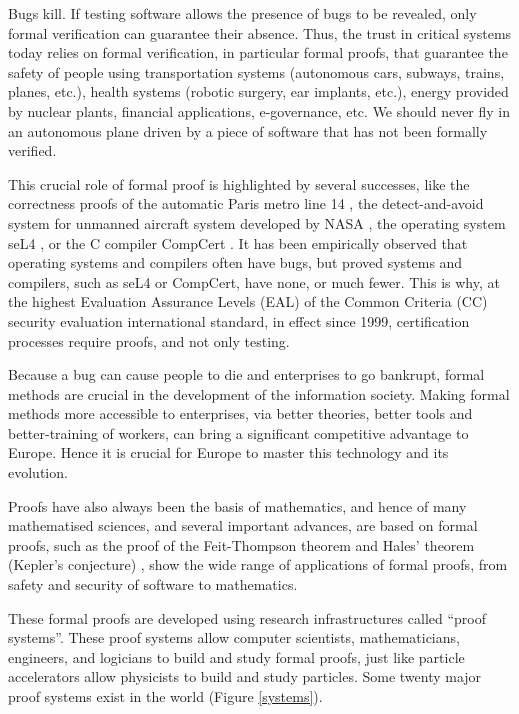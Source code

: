 \thispagestyle{empty}

Bugs kill.  If testing software allows the presence of bugs to be
revealed, only formal verification can guarantee their absence.
Thus, the
trust in critical systems today relies on formal verification, in
particular formal proofs, that guarantee the safety of people
using transportation systems (autonomous cars, subways, trains,
planes, etc.), health systems (robotic surgery, ear implants, etc.), energy provided
by nuclear plants, financial applications, e-governance, etc.  We
should never fly in an autonomous plane driven by a piece of software
that has not been formally verified.

This crucial role of formal proof is highlighted by several successes,
like the correctness proofs of the automatic Paris metro line 14
\cite{Behm98,Lecomte17}, the detect-and-avoid system for unmanned aircraft
system developed by NASA \cite{Munoz16}, the operating system seL4
\cite{Klein09}, or the C compiler CompCert \cite{Leroy06}.  It has
been empirically observed that operating systems and compilers
often
have bugs, but proved systems and compilers, such as seL4 or CompCert, have
none, or
much fewer.  This is why, at the highest Evaluation Assurance Levels (EAL)
of the Common Criteria (CC) security evaluation international standard, in
effect since 1999, certification processes require proofs, and not
only testing.

Because a bug can cause people to die and enterprises to go bankrupt,
formal methods are crucial in the development of the information
society. Making formal methods more accessible to enterprises, via
better theories, better tools and better-training of workers, can
bring a significant competitive advantage to Europe.  Hence it is
crucial for Europe to master this technology and its evolution.

Proofs have also always been the basis of mathematics, and hence of
many mathematised sciences, and several important advances, are based
on formal proofs, such as the proof of the Feit-Thompson theorem
\cite{Gonthier13} and Hales' theorem (Kepler's conjecture)
\cite{Hales17}, show the wide range of applications of formal proofs,
from safety and security of software to mathematics.

These formal proofs are developed using research infrastructures called
``proof systems''.  These proof systems allow computer scientists,
mathematicians, engineers, and logicians to build and study formal
proofs, just like particle accelerators allow physicists to build and
study particles.  Some twenty major proof systems exist in the world
(Figure \ref{systems}).


